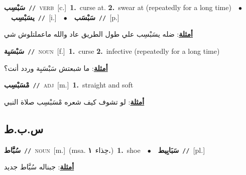 \documentclass[10pt,a4paper,twoside]{article} %
\begin{document}
\begin{multicols}{2}
{{{{{{\setlength\topsep{0pt}\textbf{\foreignlanguage{arabic}{سَبْسِب}}\ {\color{gray}\texttt{//}\color{black}}\ \textsc{verb}\ [c.]\ \textbf{1.}~curse at.  \textbf{2.}~swear at (repeatedly for a long time)\ \ $\bullet$\ \ \setlength\topsep{0pt}\textbf{\foreignlanguage{arabic}{يسَبْسِب}}\ {\color{gray}\texttt{//}\color{black}}\ [i.]\ \ $\bullet$\ \ \setlength\topsep{0pt}\textbf{\foreignlanguage{arabic}{سَبْسَب}}\ {\color{gray}\texttt{//}\color{black}}\ [p.]\  \begin{flushright}\color{gray}\foreignlanguage{arabic}{\textbf{\underline{\foreignlanguage{arabic}{أمثلة}}}: ضله يسَبْسِب علي طول الطريق عاد والله ماعملتلوش شي}\end{flushright}\color{black}} \vspace{2mm}

{\setlength\topsep{0pt}\textbf{\foreignlanguage{arabic}{سَبْسَبِة}}\ {\color{gray}\texttt{//}\color{black}}\ \textsc{noun}\ [f.]\ \textbf{1.}~curse  \textbf{2.}~infective (repeatedly for a long time)\  \begin{flushright}\color{gray}\foreignlanguage{arabic}{\textbf{\underline{\foreignlanguage{arabic}{أمثلة}}}: ما شبعتش سَبْسَبِة وردد أنت؟}\end{flushright}\color{black}} \vspace{2mm}

{\setlength\topsep{0pt}\textbf{\foreignlanguage{arabic}{مْسَبْسِب}}\ {\color{gray}\texttt{//}\color{black}}\ \textsc{adj}\ [m.]\ \textbf{1.}~straight and soft\  \begin{flushright}\color{gray}\foreignlanguage{arabic}{\textbf{\underline{\foreignlanguage{arabic}{أمثلة}}}: لو تشوف كيف شعره مْسَبْسِب صلاة النبي}\end{flushright}\color{black}} \vspace{2mm}

\vspace{-3mm}
\subsection*{\color{blue}\foreignlanguage{arabic}{س.ب.ط}\color{blue}{}} 

{\setlength\topsep{0pt}\textbf{\foreignlanguage{arabic}{سُبََّاط}}\ {\color{gray}\texttt{//}\color{black}}\ \textsc{noun}\ [m.]\ \color{gray}(msa. \foreignlanguage{arabic}{حِذاء}~\foreignlanguage{arabic}{\textbf{١.}})\color{black}\ \textbf{1.}~shoe\ \ $\bullet$\ \ \setlength\topsep{0pt}\textbf{\foreignlanguage{arabic}{سَبَابِيط}}\ {\color{gray}\texttt{//}\color{black}}\ [pl.]\  \begin{flushright}\color{gray}\foreignlanguage{arabic}{\textbf{\underline{\foreignlanguage{arabic}{أمثلة}}}: جبناله سُبَّاط جديد}\end{flushright}\color{black}} \vspace{2mm}

}}}}}
\end{multicols}
\end{document}
